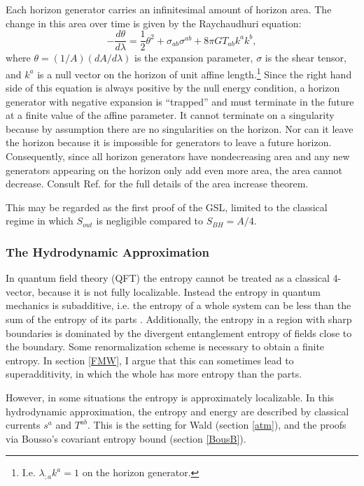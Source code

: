 \documentclass{article}
\begin{document}
Each horizon generator carries an infinitesimal amount of horizon area.  The change in this area over time is given by the Raychaudhuri equation:
\begin{equation}\label{Ray}
-\frac{d\theta}{d\lambda} = \frac{1}{2}\theta^2 
+ \sigma_{ab}\sigma^{ab}
+ 8\pi G T_{ab}k^ak^b,
\end{equation}
where $\theta = (1/A)({dA}/{d\lambda})$ is the expansion parameter, $\sigma$ is the shear tensor, and $k^a$ is a null vector on the horizon of unit affine length.\footnote{I.e. $\lambda_{;a} k^a = 1$ on the horizon generator.}  Since the right hand side of this equation is always positive by the null energy condition, a horizon generator with negative expansion is ``trapped'' and must terminate in the future at a finite value of the affine parameter.  It cannot terminate on a singularity because by assumption there are no singularities on the horizon.  Nor can it leave the horizon because it is impossible for generators to leave a future horizon.  Consequently, since all horizon generators have nondecreasing area and any new generators appearing on the horizon only add even more area, the area cannot decrease.  Consult Ref. \cite{WALDBOOK} for the full details of the area increase theorem.

This may be regarded as the first proof of the GSL, limited to the classical regime in which $S_{out}$ is negligible compared to $S_{BH} = A/4$.

\subsubsection{The Hydrodynamic Approximation}\label{hydro}

In quantum field theory (QFT) the entropy cannot be treated as a classical 4-vector, because it is not fully localizable.  Instead the entropy in quantum mechanics is subadditive, i.e. the entropy of a whole system can be less than the sum of the entropy of its parts \cite{wehrl78}.  Additionally, the entropy in a region with sharp boundaries is dominated by the divergent entanglement entropy of fields close to the boundary.  Some renormalization scheme is necessary to obtain a finite entropy.  In section \ref{FMW}, I argue that this can sometimes lead to superadditivity, in which the whole has more entropy than the parts.

However, in some situations the entropy is approximately localizable.  In this hydrodynamic approximation, the entropy and energy are described by classical currents $s^a$ and $T^{ab}$.  This is the setting for Wald \cite{wald94} (section \ref{atm}), and the proofs via Bousso's covariant entropy bound \cite{FMW00}\cite{BFM03} (section \ref{BousB}).
\end{document}
